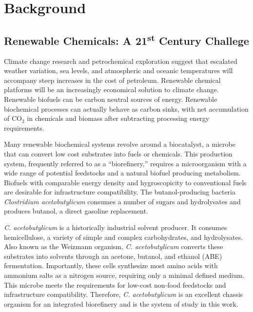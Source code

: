 
\chapter{Background}

\section{Renewable Chemicals: A 21\textsuperscript{st} Century Challege}
Climate change research\cite{95} and petrochemical exploration\cite{120,121} suggest that escalated weather variation, sea levels, and atmospheric and oceanic temperatures will accompany steep increases in the cost of petroleum. Renewable chemical platforms will be an increasingly economical solution to climate change. Renewable biofuels can be carbon neutral sources of energy. Renewable biochemical processes can actually behave as carbon sinks, with net accumulation of CO$_{2}$ in chemicals and biomass after subtracting processing energy requirements.

Many renewable biochemical systems revolve around a biocatalyst, a microbe that can convert low cost substrates into fuels or chemicals.\cite{3,4,13,16,24,26} This production system, frequently referred to as a ``biorefinery,'' requires a microorganism with a wide range of potential feedstocks and a natural biofuel producing metabolism. Biofuels with comparable energy density and hygroscopicity to conventional fuels are desirable for infrastructure compatibility. The butanol-producing bacteria \textit{Clostridium acetobutylicum} consumes a number of sugars and hydrolysates\cite{101} and produces butanol, a direct gasoline replacement.\cite{122}

\textit{C. acetobutylicum} is a historically industrial solvent producer.\cite{123} It consumes hemicellulose, a variety of simple and complex carbohydrates, and hydrolysates.\cite{101,123} Also known as the Weizmann organism, \textit{C. acetobutylicum} converts these substrates into solvents through an acetone, butanol, and ethanol (ABE) fermentation.\cite{101,123} Importantly, these cells synthesize most amino acids with ammonium salts as a nitrogen source, requiring only a minimal defined medium.\cite{124,39} This microbe meets the requirements for low-cost non-food feedstocks and infrastructure compatibility. Therefore, \textit{C. acetobutylicum} is an excellent chassis organism for an integrated biorefinery and is the system of study in this work.

